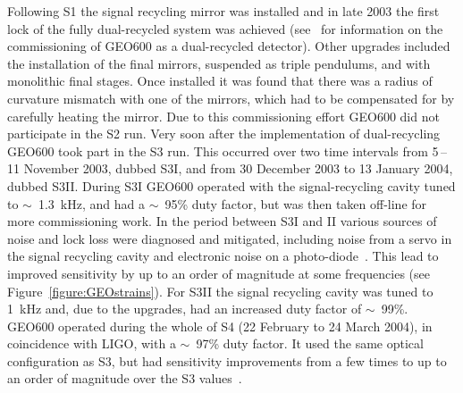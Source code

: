 \documentclass{article}
\begin{document}

Following S1 the signal recycling mirror was installed and in late 2003 the
first lock of the fully dual-recycled system was achieved
(see~\cite{Smith:2004, Willke:2004, Grote:2005} for information on the
commissioning of GEO600 as a dual-recycled detector). Other upgrades included the
installation of the final mirrors, suspended as triple pendulums, and with
monolithic final stages. Once installed it was found that there was a radius of
curvature mismatch with one of the mirrors, which had to be compensated for by
carefully heating the mirror. Due to this commissioning effort GEO600 did not
participate in the S2 run. Very soon after the implementation of dual-recycling
GEO600 took part in the S3 run. This occurred over two time intervals from
5\,--\,11 November 2003, dubbed S3I, and from 30 December 2003 to 13 January 2004,
dubbed S3II. During S3I GEO600 operated with the signal-recycling cavity tuned
to $\sim$~1.3~kHz, and had a $\sim$~95\% duty factor, but was then taken
off-line for more commissioning work. In the period between S3I and II various
sources of noise and lock loss were diagnosed and mitigated, including noise
from a servo in the signal recycling cavity and electronic noise on a
photo-diode~\cite{Smith:2004}. This lead to improved sensitivity by up to an
order of magnitude at some frequencies (see Figure~\ref{figure:GEOstrains}). For
S3II the signal recycling cavity was tuned to 1~kHz and, due to the upgrades,
had an increased duty factor of $\sim$~99\%. GEO600 operated during the whole of
S4 (22 February to 24 March 2004), in coincidence with LIGO, with a $\sim$~97\%
duty factor. It used the same optical configuration as S3, but had sensitivity
improvements from a few times to up to an order of magnitude over the S3
values~\cite{Hild:2006a}.
\end{document}
